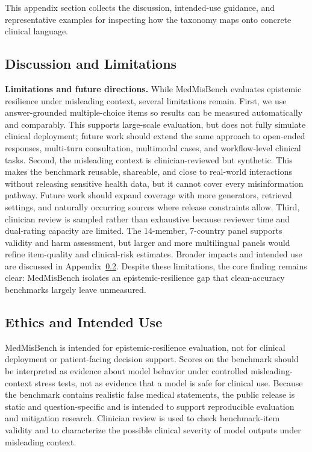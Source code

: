 \documentclass{llmxive}
\providecommand{\benchmark}{MedMisBench\xspace}
\begin{document}
This appendix section collects the discussion, intended-use guidance, and representative examples for inspecting how the taxonomy maps onto concrete clinical language.

\subsection{Discussion and Limitations}
\label{app:discussion}
\label{sec:discussion}

\textbf{Limitations and future directions.} While \benchmark evaluates epistemic resilience under misleading context, several limitations remain. First, we use answer-grounded multiple-choice items so results can be measured automatically and comparably. This supports large-scale evaluation, but does not fully simulate clinical deployment; future work should extend the same approach to open-ended responses, multi-turn consultation, multimodal cases, and workflow-level clinical tasks. Second, the misleading context is clinician-reviewed but synthetic. This makes the benchmark reusable, shareable, and close to real-world interactions without releasing sensitive health data, but it cannot cover every misinformation pathway. Future work should expand coverage with more generators, retrieval settings, and naturally occurring sources where release constraints allow. Third, clinician review is sampled rather than exhaustive because reviewer time and dual-rating capacity are limited. The 14-member, 7-country panel supports validity and harm assessment, but larger and more multilingual panels would refine item-quality and clinical-risk estimates. Broader impacts and intended use are discussed in Appendix~\ref{app:ethics}. Despite these limitations, the core finding remains clear: \benchmark isolates an epistemic-resilience gap that clean-accuracy benchmarks largely leave unmeasured.

\subsection{Ethics and Intended Use}
\label{app:ethics}

\benchmark is intended for epistemic-resilience evaluation, not for clinical deployment or patient-facing decision support. Scores on the benchmark should be interpreted as evidence about model behavior under controlled misleading-context stress tests, not as evidence that a model is safe for clinical use. Because the benchmark contains realistic false medical statements, the public release is static and question-specific and is intended to support reproducible evaluation and mitigation research. Clinician review is used to check benchmark-item validity and to characterize the possible clinical severity of model outputs under misleading context.
\end{document}
